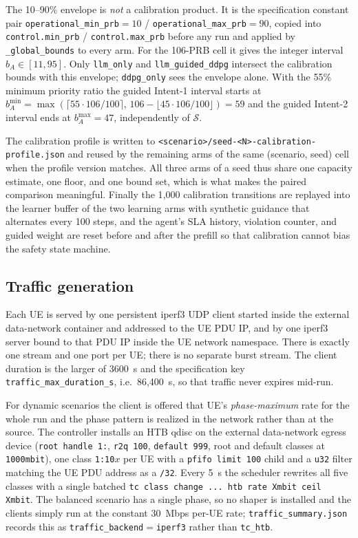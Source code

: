 The 10--90\% envelope is \emph{not} a calibration product. It is the specification constant
pair \texttt{operational\_min\_prb}${}=10$ / \texttt{operational\_max\_prb}${}=90$, copied into
\texttt{control.min\_prb} / \texttt{control.max\_prb} before any run and applied by
\texttt{\_global\_bounds} to every arm. For the 106-PRB cell it gives the integer interval
$b_A\in[11,95]$. Only \texttt{llm\_only} and \texttt{llm\_guided\_ddpg} intersect the
calibration bounds with this envelope; \texttt{ddpg\_only} sees the envelope alone. With the
55\% minimum priority ratio the guided Intent-1 interval starts at
$b_A^{\min}=\max(\lceil 55\cdot106/100\rceil,\,106-\lfloor 45\cdot106/100\rfloor)=59$ and the
guided Intent-2 interval ends at $b_A^{\max}=47$, independently of $\mathcal{S}$.

The calibration profile is written to
\texttt{<scenario>/seed-<N>-calibration-profile.json} and reused by the remaining arms of the
same (scenario, seed) cell when the profile version matches. All three arms of a seed thus
share one capacity estimate, one floor, and one bound set, which is what makes the paired
comparison meaningful. Finally the 1{,}000 calibration transitions are replayed into the
learner buffer of the two learning arms with synthetic guidance that alternates every 100
steps, and the agent's SLA history, violation counter, and guided weight are reset before and
after the prefill so that calibration cannot bias the safety state machine.

\subsection{Traffic generation}
Each UE is served by one persistent iperf3 UDP client started inside the external data-network
container and addressed to the UE PDU IP, and by one iperf3 server bound to that PDU IP inside
the UE network namespace. There is exactly one stream and one port per UE; there is no
separate burst stream. The client duration is the larger of 3600~s and the specification key
\texttt{traffic\_max\_duration\_s}, i.e.\ 86{,}400~s, so that traffic never expires mid-run.

For dynamic scenarios the client is offered that UE's \emph{phase-maximum} rate for the whole
run and the phase pattern is realized in the network rather than at the source. The controller
installs an HTB qdisc on the external data-network egress device (\texttt{root handle 1:},
\texttt{r2q 100}, \texttt{default 999}, root and default classes at \texttt{1000mbit}), one
class \texttt{1:10}$x$ per UE with a \texttt{pfifo limit 100} child and a \texttt{u32} filter
matching the UE PDU address as a \texttt{/32}. Every 5~s the scheduler rewrites all five
classes with a single batched \texttt{tc class change ... htb rate Xmbit ceil Xmbit}. The
balanced scenario has a single phase, so no shaper is installed and the clients simply run at
the constant 30~Mbps per-UE rate; \texttt{traffic\_summary.json} records this as
\texttt{traffic\_backend}${}=$\texttt{iperf3} rather than \texttt{tc\_htb}.

